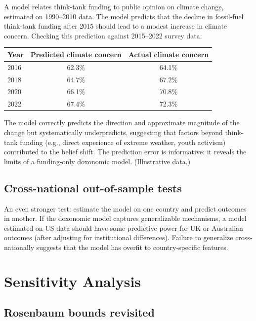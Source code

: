 \begin{example}
\label{ex:temporal-prediction}
A model relates think-tank funding to public opinion on climate change, estimated on 1990--2010 data.
The model predicts that the decline in fossil-fuel think-tank funding after 2015 should lead to a modest increase in climate concern.
Checking this prediction against 2015--2022 survey data:

\begin{center}
\begin{tabular}{lcc}
\toprule
Year & Predicted climate concern & Actual climate concern \\
\midrule
2016 & 62.3\% & 64.1\% \\
2018 & 64.7\% & 67.2\% \\
2020 & 66.1\% & 70.8\% \\
2022 & 67.4\% & 72.3\% \\
\bottomrule
\end{tabular}
\end{center}
The model correctly predicts the direction and approximate magnitude of the change but systematically underpredicts, suggesting that factors beyond think-tank funding (e.g., direct experience of extreme weather, youth activism) contributed to the belief shift.
The prediction error is informative: it reveals the limits of a funding-only doxonomic model.
(Illustrative data.)
\end{example}

\subsection{Cross-national out-of-sample tests}

An even stronger test: estimate the model on one country and predict outcomes in another.
If the doxonomic model captures generalizable mechanisms, a model estimated on US data should have some predictive power for UK or Australian outcomes (after adjusting for institutional differences).
Failure to generalize cross-nationally suggests that the model has overfit to country-specific features.

\section{Sensitivity Analysis}
\label{sec:ch20-sensitivity}

\subsection{Rosenbaum bounds revisited}

